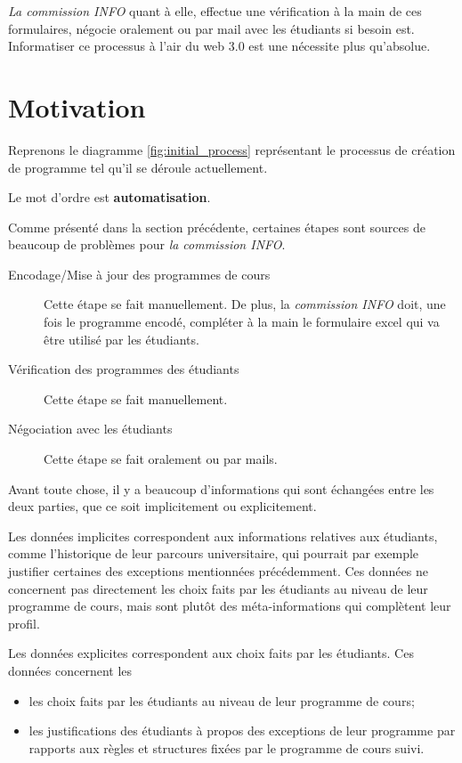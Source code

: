 \textit{La commission INFO} quant à elle, effectue une vérification à la main de ces formulaires, négocie oralement ou par mail avec les étudiants si besoin est. 
Informatiser ce processus à l'air du web 3.0 est une nécessite plus qu'absolue.



\section{Motivation}
\label{motivations}
Reprenons le diagramme \ref{fig:initial_process} représentant le processus de création de programme tel qu'il se déroule actuellement. 

Le mot d'ordre est \textbf{automatisation}.

Comme présenté dans la section précédente, certaines étapes sont sources de beaucoup de problèmes pour \textit{la commission INFO}.

\begin{description}
  \item[Encodage/Mise à jour des programmes de cours] Cette étape se fait manuellement. De plus, la \textit{ commission INFO} doit, une fois le programme encodé, compléter à la main le formulaire excel qui va être utilisé par les étudiants. 
  \item[Vérification des programmes des étudiants]  Cette étape se fait manuellement. 
  \item[Négociation avec les étudiants] Cette étape se fait oralement ou par mails.
\end{description} 

Avant toute chose, il y a beaucoup d'informations qui sont échangées entre les deux parties, que ce soit implicitement ou explicitement.

Les données implicites correspondent aux informations relatives aux étudiants, comme l'historique de leur parcours universitaire, qui pourrait par exemple justifier certaines des exceptions mentionnées précédemment. Ces données ne concernent pas directement les choix faits par les étudiants au niveau de leur programme de cours, mais sont plutôt des méta-informations qui complètent leur profil. 

Les données explicites correspondent aux choix faits par les étudiants. Ces données concernent les
\begin{itemize}
\item les choix faits par les étudiants au niveau de leur programme de cours;
\item les justifications des étudiants à propos des exceptions de leur programme par rapports aux règles et structures fixées par le programme de cours suivi. 
\end{itemize}

